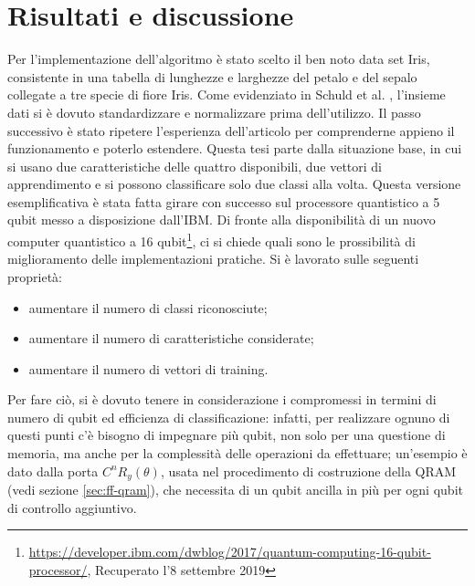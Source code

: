 \chapter{Risultati e discussione}\label{ch:risultati}


Per l'implementazione dell'algoritmo è stato scelto il ben noto 
data set Iris, consistente in una tabella di lunghezze e larghezze 
del petalo e del sepalo collegate a tre specie di fiore Iris. 
Come evidenziato in Schuld et al. \cite{schuld}, 
l'insieme dati si è dovuto standardizzare e 
normalizzare prima dell'utilizzo. 
Il passo successivo è stato ripetere l'esperienza dell'articolo 
per comprenderne appieno il funzionamento e poterlo estendere. 
Questa tesi parte dalla situazione base, in cui
si usano due caratteristiche delle 
quattro disponibili, due vettori di apprendimento 
e si possono classificare solo due classi alla volta. 
Questa versione esemplificativa è stata fatta girare con successo 
sul processore quantistico a 5 qubit messo a disposizione dall'IBM.
Di fronte alla disponibilità di un nuovo computer quantistico a 16 
qubit\footnote{\url{https://developer.ibm.com/dwblog/2017/quantum-computing-16-qubit-processor/}, 
Recuperato l'8 settembre 2019}, 
ci si chiede quali sono le prossibilità di miglioramento delle 
implementazioni pratiche. Si è lavorato sulle seguenti proprietà: 
\begin{itemize}
    \item aumentare il numero di classi riconosciute;
    \item aumentare il numero di caratteristiche considerate;
    \item aumentare il numero di vettori di training.
\end{itemize}
Per fare ciò, si è dovuto tenere in considerazione i compromessi 
in termini di numero di qubit ed efficienza di classificazione: 
infatti, per realizzare ognuno di questi punti c'è bisogno di impegnare 
più qubit, non solo per una questione di memoria, ma anche per 
la complessità delle operazioni da effettuare; un'esempio è dato 
dalla porta $C^n R_y (\theta)$, usata nel procedimento di costruzione 
della \ac{QRAM} (vedi sezione \ref{sec:ff-qram}), che necessita di un 
qubit ancilla in più per ogni qubit di controllo aggiuntivo. 

